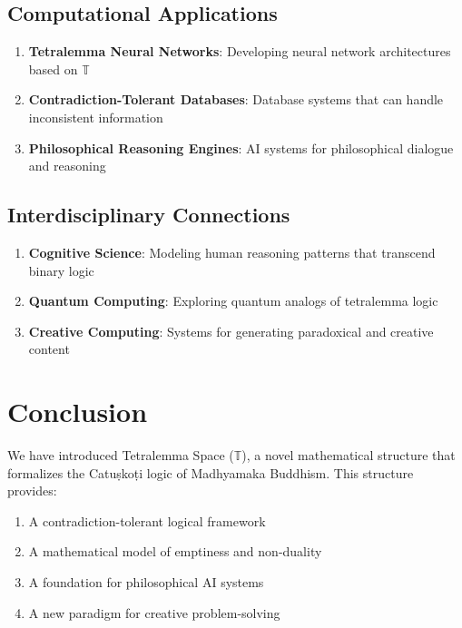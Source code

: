 \documentclass[11pt,a4paper]{article}
\begin{document}
\subsection{Computational Applications}

\begin{enumerate}
    \item \textbf{Tetralemma Neural Networks}: Developing neural network architectures based on $\mathbb{T}$
    \item \textbf{Contradiction-Tolerant Databases}: Database systems that can handle inconsistent information
    \item \textbf{Philosophical Reasoning Engines}: AI systems for philosophical dialogue and reasoning
\end{enumerate}

\subsection{Interdisciplinary Connections}

\begin{enumerate}
    \item \textbf{Cognitive Science}: Modeling human reasoning patterns that transcend binary logic
    \item \textbf{Quantum Computing}: Exploring quantum analogs of tetralemma logic
    \item \textbf{Creative Computing}: Systems for generating paradoxical and creative content
\end{enumerate}

\section{Conclusion}

We have introduced Tetralemma Space ($\mathbb{T}$), a novel mathematical structure that formalizes the Catuṣkoṭi logic of Madhyamaka Buddhism. This structure provides:

\begin{enumerate}
    \item A contradiction-tolerant logical framework
    \item A mathematical model of emptiness and non-duality
    \item A foundation for philosophical AI systems
    \item A new paradigm for creative problem-solving
\end{enumerate}
\end{document}

